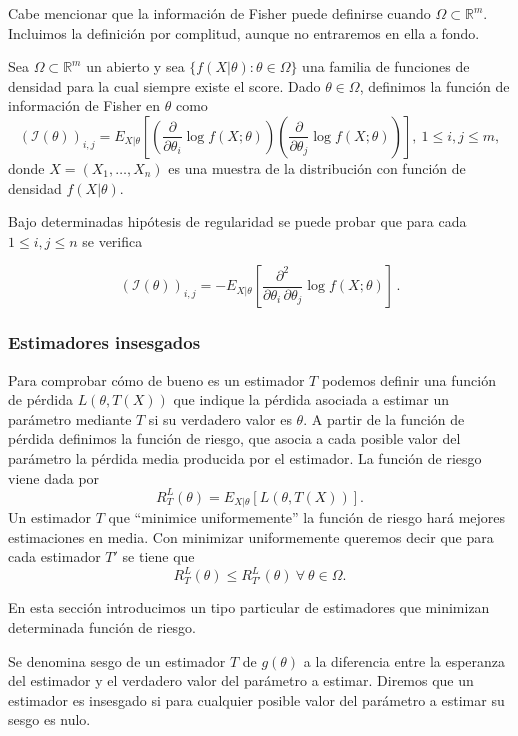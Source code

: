 \documentclass{article}
\begin{document}
    Cabe mencionar que la información de Fisher puede definirse cuando $\Omega \subset \mathbb{R}^m$. Incluimos la definición por complitud, aunque no entraremos en ella a fondo.

    \begin{definition}
        Sea $\Omega \subset \mathbb{R}^m$ un abierto y sea $\{f(X|\theta): \theta \in \Omega\}$ una familia de funciones de densidad para la cual siempre existe el score. Dado $\theta \in \Omega$, definimos la función de información de Fisher en $\theta$ como
        \[{\left(\mathcal{I} \left(\theta \right) \right)}_{i, j} = E_{X|\theta} \left[
          \left(\frac{\partial}{\partial\theta_i} \log f(X;\theta)\right)
          \left(\frac{\partial}{\partial\theta_j} \log f(X;\theta)\right)\right], \ 1 \le i,j \le m,\]
        donde $X = (X_1, \ldots, X_n)$ es una muestra de la distribución con función de densidad $f(X|\theta)$.
    \end{definition}

    Bajo determinadas hipótesis de regularidad se puede probar que para cada $1 \le i, j \le n$ se verifica

    \[{\left(\mathcal{I} \left(\theta \right) \right)}_{i, j} =
      -E_{X|\theta}\left[\frac{\partial^2}{\partial\theta_i \, \partial\theta_j} \log f(X;\theta)
    \right]\,.\]

    \subsubsection{Estimadores insesgados}

    Para comprobar cómo de bueno es un estimador $T$ podemos definir una función de pérdida $L(\theta,T(X))$ que indique la pérdida asociada a estimar un parámetro mediante $T$ si su verdadero valor es $\theta$. A partir de la función de pérdida definimos la función de riesgo, que asocia a cada posible valor del parámetro la pérdida media producida por el estimador. La función de riesgo viene dada por
    \[ R^L_T(\theta) = E_{X|\theta} [L(\theta,T(X))].\]
    Un estimador $T$ que ``minimice uniformemente'' la función de riesgo hará mejores estimaciones en media. Con minimizar uniformemente queremos decir que para cada estimador $T'$ se tiene que
    \[ R^L_T(\theta) \leq R^L_{T'}(\theta) \ \forall \ \theta \in \Omega.\]

    En esta sección introducimos un tipo particular de estimadores que minimizan determinada función de riesgo.

    \begin{definition}
        Se denomina sesgo de un estimador $T$ de $g(\theta)$ a la diferencia entre la esperanza del estimador y el verdadero valor del parámetro a estimar. Diremos que un estimador es insesgado si para cualquier posible valor del parámetro a estimar su sesgo es nulo.
    \end{definition}
\end{document}
